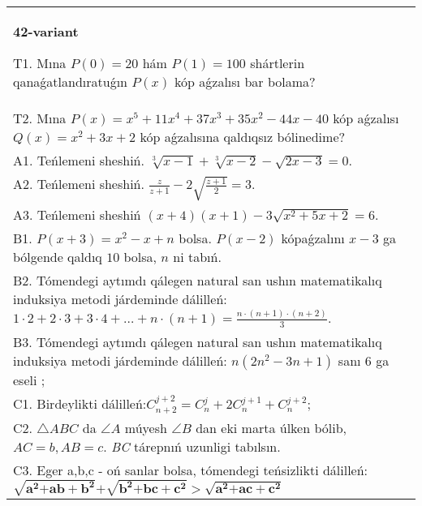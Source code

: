 \documentclass{article}
\begin{document}
\begin{tabular}{m{17cm}}
\textbf{42-variant}
\newline

T1. Mına \(P(0) = 20\) hám \(P(1) = 100\) shártlerin qanaǵatlandıratuǵın \(P(x)\) kóp aǵzalısı bar bolama? \\
T2. Mına \(P(x) = x^{5} + 11x^{4} + 37x^{3} + 35x^{2} - 44x - 40\) kóp aǵzalısı \(Q(x) = x^{2} + 3x + 2\) kóp aǵzalısına qaldıqsız bólinedime? \\
A1. Teńlemeni sheshiń. \(\sqrt[3]{x - 1} + \sqrt[3]{x - 2} - \sqrt{2x - 3} = 0\). \\
A2. Teńlemeni sheshiń. \(\frac{z}{z + 1} - 2\sqrt{\frac{z + 1}{2}} = 3\). \\
A3. Teńlemeni sheshiń \((x + 4)(x + 1) - 3\sqrt{x^{2} + 5x + 2} = 6\). \\
B1. \(P(x + 3) = x^{2} - x + n\) bolsa. \(P(x - 2)\) kópaǵzalını \(x - 3\) ga bólgende qaldıq \(10\) bolsa, \(n\) ni tabıń. \\
B2. Tómendegi aytımdı qálegen natural san ushın matematikalıq induksiya metodi járdeminde dálilleń: \(1 \cdot 2 + 2 \cdot 3 + 3 \cdot 4 + \ldots + n \cdot (n + 1) = \frac{n \cdot (n + 1) \cdot (n + 2)}{3}\). \\
B3. Tómendegi aytımdı qálegen natural san ushın matematikalıq induksiya metodi járdeminde dálilleń: \(n\left( 2n^{2} - 3n + 1 \right)\) sanı 6 ga eseli ; \\
C1. Birdeylikti dálilleń:\(C_{n + 2}^{j + 2} = C_{n}^{j} + 2C_{n}^{j + 1} + C_{n}^{j + 2}\); \\
C2. \(\bigtriangleup ABC\) da \(\angle A\) múyesh \(\angle B\) dan eki marta úlken bólib, \(AC = b,AB = c\). \emph{BC} tárepnıń uzunligi tabılsın. \\
C3. Eger a,b,c - oń sanlar bolsa, tómendegi teńsizlikti dálilleń: \(\sqrt{\mathbf{a}^{\mathbf{2}}\mathbf{+ ab +}\mathbf{b}^{\mathbf{2}}}\mathbf{+}\sqrt{\mathbf{b}^{\mathbf{2}}\mathbf{+ bc +}\mathbf{c}^{\mathbf{2}}}\mathbf{>}\sqrt{\mathbf{a}^{\mathbf{2}}\mathbf{+ ac +}\mathbf{c}^{\mathbf{2}}}\) \\

\end{tabular}
\vspace{1cm}
\end{document}
